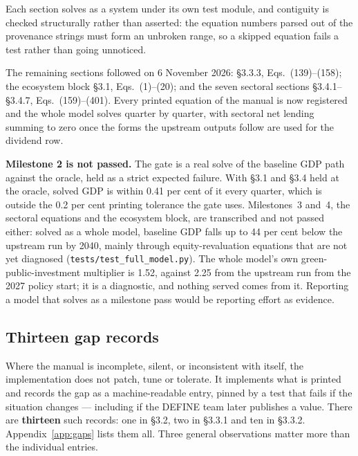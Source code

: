 \noindent Each section solves as a system under its own test module, and contiguity is checked structurally rather than asserted: the equation numbers parsed out of the provenance strings must form an unbroken range, so a skipped equation fails a test rather than going unnoticed.

The remaining sections followed on 6 November 2026: \S3.3.3, Eqs.~(139)--(158); the ecosystem block \S3.1, Eqs.~(1)--(20); and the seven sectoral sections \S3.4.1--\S3.4.7, Eqs.~(159)--(401). Every printed equation of the manual is now registered and the whole model solves quarter by quarter, with sectoral net lending summing to zero once the forms the upstream outputs follow are used for the dividend row.

\textbf{Milestone 2 is not passed.} The gate is a real solve of the baseline GDP path against the oracle, held as a strict expected failure. With \S3.1 and \S3.4 held at the oracle, solved GDP is within 0.41 per cent of it every quarter, which is outside the 0.2 per cent printing tolerance the gate uses. Milestones~3 and~4, the sectoral equations and the ecosystem block, are transcribed and not passed either: solved as a whole model, baseline GDP falls up to 44 per cent below the upstream run by 2040, mainly through equity-revaluation equations that are not yet diagnosed (\texttt{tests/test\_full\_model.py}). The whole model's own green-public-investment multiplier is 1.52, against 2.25 from the upstream run from the 2027 policy start; it is a diagnostic, and nothing served comes from it. Reporting a model that solves as a milestone pass would be reporting effort as evidence.

\subsection{Thirteen gap records}
\label{sec:gaps}

Where the manual is incomplete, silent, or inconsistent with itself, the implementation does not patch, tune or tolerate. It implements what is printed and records the gap as a machine-readable entry, pinned by a test that fails if the situation changes --- including if the DEFINE team later publishes a value. There are \textbf{thirteen} such records: one in \S3.2, two in \S3.3.1 and ten in \S3.3.2. Appendix~\ref{app:gaps} lists them all. Three general observations matter more than the individual entries.


